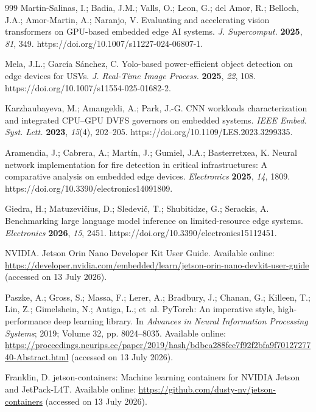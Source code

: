 \documentclass[electronics,article,submit,pdftex,moreauthors]{Definitions/mdpi}
\newcommand{\etal}{et~al.}
\begin{document}
\begin{thebibliography}{999}
Martin-Salinas, I.; Badia, J.M.; Valls, O.; Leon, G.; del Amor, R.; Belloch, J.A.; Amor-Martin, A.; Naranjo, V. Evaluating and accelerating vision transformers on GPU-based embedded edge AI systems. \emph{J. Supercomput.} \textbf{2025}, \emph{81}, 349. https://doi.org/10.1007/s11227-024-06807-1.

Mela, J.L.; Garc\'ia S\'anchez, C. Yolo-based power-efficient object detection on edge devices for USVs. \emph{J. Real-Time Image Process.} \textbf{2025}, \emph{22}, 108. https://doi.org/10.1007/s11554-025-01682-2.

Karzhaubayeva, M.; Amangeldi, A.; Park, J.-G. CNN workloads characterization and integrated CPU--GPU DVFS governors on embedded systems. \emph{IEEE Embed. Syst. Lett.} \textbf{2023}, \emph{15}(4), 202--205. https://doi.org/10.1109/LES.2023.3299335.

Aramendia, J.; Cabrera, A.; Mart\'in, J.; Gumiel, J.A.; Basterretxea, K. Neural network implementation for fire detection in critical infrastructures: A comparative analysis on embedded edge devices. \emph{Electronics} \textbf{2025}, \emph{14}, 1809. https://doi.org/10.3390/electronics14091809.

Giedra, H.; Matuzevi\v{c}ius, D.; Sledevi\v{c}, T.; Shubitidze, G.; Serackis, A. Benchmarking large language model inference on limited-resource edge systems. \emph{Electronics} \textbf{2026}, \emph{15}, 2451. https://doi.org/10.3390/electronics15112451.

NVIDIA. Jetson Orin Nano Developer Kit User Guide. Available online: \url{https://developer.nvidia.com/embedded/learn/jetson-orin-nano-devkit-user-guide} (accessed on 13 July 2026).

Paszke, A.; Gross, S.; Massa, F.; Lerer, A.; Bradbury, J.; Chanan, G.; Killeen, T.; Lin, Z.; Gimelshein, N.; Antiga, L.; \etal{} PyTorch: An imperative style, high-performance deep learning library. In \emph{Advances in Neural Information Processing Systems}; 2019; Volume 32, pp. 8024--8035. Available online: \url{https://proceedings.neurips.cc/paper/2019/hash/bdbca288fee7f92f2bfa9f7012727740-Abstract.html} (accessed on 13 July 2026).

Franklin, D. jetson-containers: Machine learning containers for NVIDIA Jetson and JetPack-L4T. Available online: \url{https://github.com/dusty-nv/jetson-containers} (accessed on 13 July 2026).


\end{thebibliography}
\end{document}
